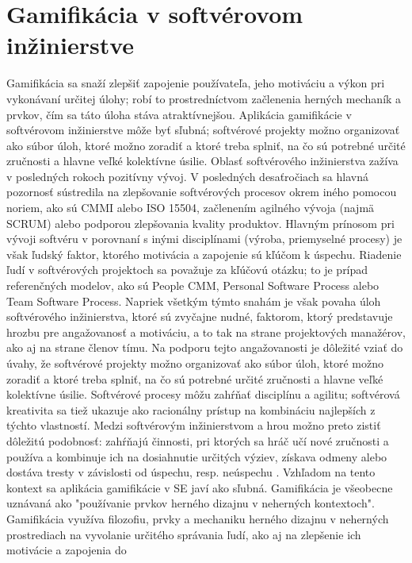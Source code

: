 \documentclass[14pt,a4paper]{article}
\begin{document}
\section{Gamifikácia v softvérovom inžinierstve}
Gamifikácia sa snaží zlepšiť zapojenie používateľa, 
jeho motiváciu a výkon pri vykonávaní určitej úlohy; 
robí to prostredníctvom začlenenia herných mechaník a prvkov, 
čím sa táto úloha stáva atraktívnejšou. 
Aplikácia gamifikácie v softvérovom inžinierstve môže byť sľubná; 
softvérové projekty možno organizovať ako súbor úloh, 
ktoré možno zoradiť a ktoré treba splniť, 
na čo sú potrebné určité zručnosti a hlavne veľké kolektívne úsilie.
Oblasť softvérového inžinierstva zažíva v posledných rokoch pozitívny vývoj.
V posledných desaťročiach sa hlavná pozornosť sústredila na 
zlepšovanie softvérových procesov okrem iného pomocou noriem, 
ako sú CMMI alebo ISO 15504, začlenením agilného vývoja (najmä SCRUM) 
alebo podporou zlepšovania kvality produktov. 
Hlavným prínosom pri vývoji softvéru v porovnaní s inými 
disciplínami (výroba, priemyselné procesy) je však ľudský faktor, 
ktorého motivácia a zapojenie sú kľúčom k úspechu. 
Riadenie ľudí v softvérových projektoch sa považuje za kľúčovú otázku; 
to je prípad referenčných modelov, ako sú People CMM, 
Personal Software Process alebo Team Software Process. 
Napriek všetkým týmto snahám je však povaha úloh softvérového inžinierstva, 
ktoré sú zvyčajne nudné, faktorom, ktorý predstavuje hrozbu pre 
angažovanosť a motiváciu, a to tak na strane projektových manažérov, 
ako aj na strane členov tímu.
Na podporu tejto angažovanosti je dôležité vziať do úvahy, 
že softvérové projekty možno organizovať ako súbor úloh, 
ktoré možno zoradiť a ktoré treba splniť, 
na čo sú potrebné určité zručnosti a hlavne veľké kolektívne úsilie. 
Softvérové procesy môžu zahŕňať disciplínu a agilitu; 
softvérová kreativita sa tiež ukazuje ako racionálny prístup na 
kombináciu najlepších z týchto vlastností. 
Medzi softvérovým inžinierstvom a hrou možno preto zistiť 
dôležitú podobnosť: zahŕňajú činnosti, 
pri ktorých sa hráč učí nové zručnosti a používa a kombinuje ich 
na dosiahnutie určitých výziev, získava odmeny alebo dostáva tresty 
v závislosti od úspechu, resp. neúspechu .
Vzhľadom na tento kontext sa aplikácia gamifikácie v SE javí ako sľubná. 
Gamifikácia je všeobecne uznávaná ako "používanie prvkov herného dizajnu 
v neherných kontextoch". Gamifikácia využíva filozofiu, prvky a 
mechaniku herného dizajnu v neherných prostrediach na vyvolanie určitého 
správania ľudí, ako aj na zlepšenie ich motivácie a zapojenia do 
\end{document}
